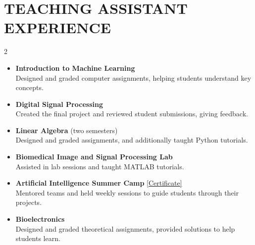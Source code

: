 \documentclass[11pt,a4paper,roman]{moderncv}        %
\begin{document}
   \section{TEACHING ASSISTANT EXPERIENCE}
    \vspace{-5mm}
    \begin{multicols}{2}
    \begin{itemize}
    \item \textbf{Introduction to Machine Learning} \\
    Designed and graded computer assignments, helping students understand key concepts.
    \vspace{2mm}
    \item \textbf{Digital Signal Processing} \\ 
    Created the final project and reviewed student submissions, giving feedback.
    \vspace{2mm}
    \item \textbf{Linear Algebra} (two semesters)\\
    Designed and graded assignments, and additionally taught Python tutorials.
    \end{itemize}
    \columnbreak
    
    \begin{itemize}
    \item \textbf{Biomedical Image and Signal Processing Lab}\\ 
    Assisted in lab sessions and taught MATLAB tutorials.
    \vspace{2mm}
    \item \textbf{Artificial Intelligence Summer Camp} \href{https://drive.google.com/file/d/1zUAI_3UoY_i1v18U4TpTeEUyHadr5hqR/view?usp=share_link}{\textcolor{blue link}{[Certificate]}}  \\
    Mentored teams and held weekly sessions to guide students through their projects.
    \vspace{2mm}
    \item \textbf{Bioelectronics}  \\
    Designed and graded theoretical assignments, provided solutions to help students learn.
    \end{itemize}
    \end{multicols}
    \vspace{-6mm}

        
\end{document}
